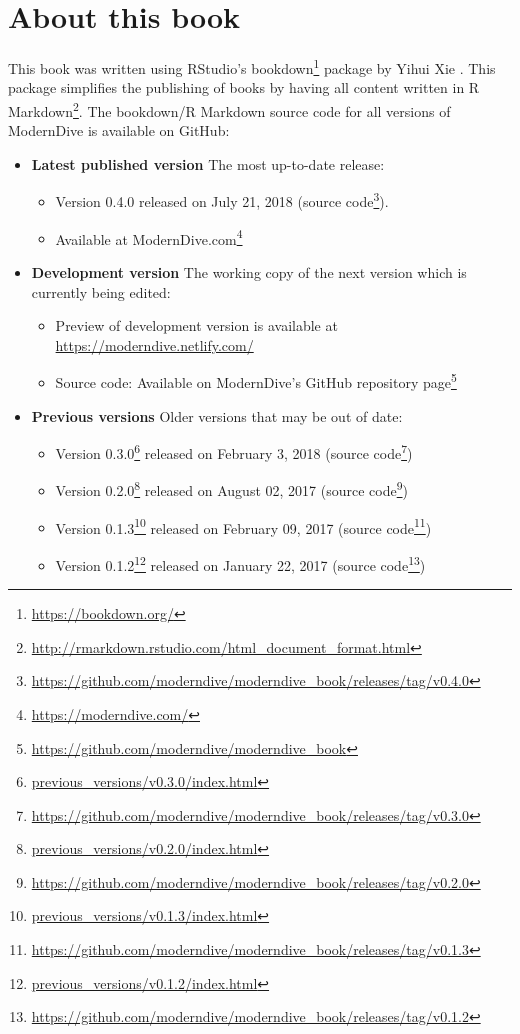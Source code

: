 \documentclass[12pt,]{krantz}
\providecommand{\tightlist}{%
  \setlength{\itemsep}{0pt}\setlength{\parskip}{0pt}}
\renewcommand{\href}[2]{#2\footnote{\url{#1}}}
\theoremstyle{definition}
\theoremstyle{definition}
\theoremstyle{definition}
\theoremstyle{remark}
\begin{document}
\hypertarget{sec:about-book}{\section{About this
book}\label{sec:about-book}}

This book was written using RStudio's
\href{https://bookdown.org/}{bookdown} package by Yihui Xie
\citep{R-bookdown}. This package simplifies the publishing of books by
having all content written in
\href{http://rmarkdown.rstudio.com/html_document_format.html}{R
Markdown}. The bookdown/R Markdown source code for all versions of
ModernDive is available on GitHub:

\begin{itemize}
\tightlist
\item
  \textbf{Latest published version} The most up-to-date release:

  \begin{itemize}
  \tightlist
  \item
    Version 0.4.0 released on July 21, 2018
    (\href{https://github.com/moderndive/moderndive_book/releases/tag/v0.4.0}{source
    code}).
  \item
    Available at \href{https://moderndive.com/}{ModernDive.com}
  \end{itemize}
\item
  \textbf{Development version} The working copy of the next version
  which is currently being edited:

  \begin{itemize}
  \tightlist
  \item
    Preview of development version is available at
    \url{https://moderndive.netlify.com/}
  \item
    Source code: Available on ModernDive's
    \href{https://github.com/moderndive/moderndive_book}{GitHub
    repository page}
  \end{itemize}
\item
  \textbf{Previous versions} Older versions that may be out of date:

  \begin{itemize}
  \tightlist
  \item
    \href{previous_versions/v0.3.0/index.html}{Version 0.3.0} released
    on February 3, 2018
    (\href{https://github.com/moderndive/moderndive_book/releases/tag/v0.3.0}{source
    code})
  \item
    \href{previous_versions/v0.2.0/index.html}{Version 0.2.0} released
    on August 02, 2017
    (\href{https://github.com/moderndive/moderndive_book/releases/tag/v0.2.0}{source
    code})
  \item
    \href{previous_versions/v0.1.3/index.html}{Version 0.1.3} released
    on February 09, 2017
    (\href{https://github.com/moderndive/moderndive_book/releases/tag/v0.1.3}{source
    code})
  \item
    \href{previous_versions/v0.1.2/index.html}{Version 0.1.2} released
    on January 22, 2017
    (\href{https://github.com/moderndive/moderndive_book/releases/tag/v0.1.2}{source
    code})
  \end{itemize}
\end{itemize}
\end{document}
